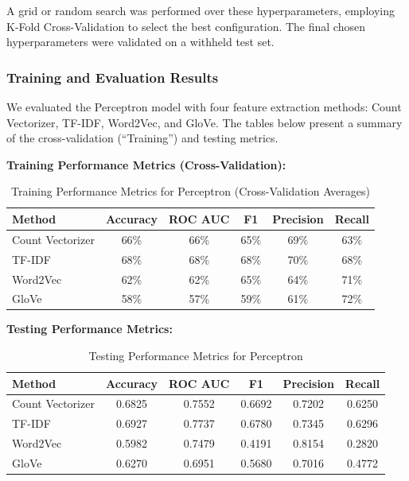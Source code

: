A grid or random search was performed over these hyperparameters, employing K-Fold Cross-Validation to select the best configuration. The final chosen hyperparameters were validated on a withheld test set.

\subsubsection{Training and Evaluation Results}

We evaluated the Perceptron model with four feature extraction methods: Count Vectorizer, TF-IDF, Word2Vec, and GloVe. The tables below present a summary of the cross-validation (“Training”) and testing metrics.

\textbf{Training Performance Metrics (Cross-Validation):}

\begin{table}[H]
    \centering
    \caption{Training Performance Metrics for Perceptron (Cross-Validation Averages)}
    \label{tab:perc-training-metrics}
    \begin{tabular}{|l|c|c|c|c|c|}
        \hline
        \textbf{Method} & \textbf{Accuracy} & \textbf{ROC AUC} & \textbf{F1} & \textbf{Precision} & \textbf{Recall} \\ 
        \hline
        Count Vectorizer & 66\% & 66\% & 65\% & 69\% & 63\% \\ 
        \hline
        TF-IDF & 68\% & 68\% & 68\% & 70\% & 68\% \\ 
        \hline
        Word2Vec & 62\% & 62\% & 65\% & 64\% & 71\% \\ 
        \hline
        GloVe & 58\% & 57\% & 59\% & 61\% & 72\% \\ 
        \hline
    \end{tabular}
\end{table}

\textbf{Testing Performance Metrics:}

\begin{table}[H]
    \centering
    \caption{Testing Performance Metrics for Perceptron}
    \label{tab:perc-testing-metrics}
    \begin{tabular}{|l|c|c|c|c|c|}
        \hline
        \textbf{Method} & \textbf{Accuracy} & \textbf{ROC AUC} & \textbf{F1} & \textbf{Precision} & \textbf{Recall} \\ 
        \hline
        Count Vectorizer & 0.6825 & 0.7552 & 0.6692 & 0.7202 & 0.6250 \\ 
        \hline
        TF-IDF & 0.6927 & 0.7737 & 0.6780 & 0.7345 & 0.6296 \\ 
        \hline
        Word2Vec & 0.5982 & 0.7479 & 0.4191 & 0.8154 & 0.2820 \\ 
        \hline
        GloVe & 0.6270 & 0.6951 & 0.5680 & 0.7016 & 0.4772 \\ 
        \hline
    \end{tabular}
\end{table}

